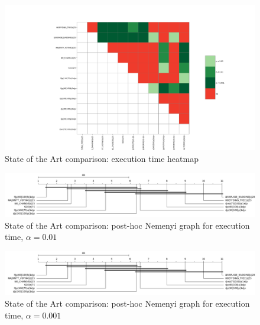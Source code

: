 \begin{figure}
  \includegraphics[width=\linewidth]{./images/appendix/heatmap_nemenyi_graphs/seconds_heatmap}
\caption{\label{fig:sota_seconds_heatmap}State of the Art comparison: execution time heatmap}
\end{figure}

\begin{figure}
  \includegraphics[width=\linewidth]{./images/appendix/heatmap_nemenyi_graphs/sota_compare_all_execution_time_nemenyi__0_99}
\caption{\label{fig:sota_seconds_099}State of the Art comparison: post-hoc Nemenyi graph for execution time, $\alpha=0.01$}
\end{figure}

\begin{figure}
  \includegraphics[width=\linewidth]{./images/appendix/heatmap_nemenyi_graphs/sota_compare_all_execution_time_nemenyi__0_99}
\caption{\label{fig:sota_seconds_0999}State of the Art comparison: post-hoc Nemenyi graph for execution time, $\alpha=0.001$}
\end{figure}
